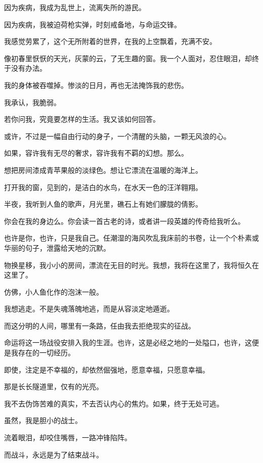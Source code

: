 		\vspace{1em}
		因为疾病，我成为乱世上，流离失所的游民。\par
		因为疾病，我被迫荷枪实弹，时刻戒备地，与命运交锋。\par
		我感觉劳累了，这个无所附着的世界，在我的上空飘着，充满不安。\par
		像初春里恹恹的天光，灰蒙的云，了无生趣的窗。我一个人面对，忍住眼泪，却终于没有办法。\par
		我的身体被吞噬掉。惨淡的日月，再也无法掩饰我的悲伤。\par
		我承认，我脆弱。

		\vspace{1em}
		若你问我，究竟要怎样的生活。我又该如何回答。\par
		或许，不过是一幅自由行动的身子，一个清醒的头脑，一颗无风浪的心。\par
		如果，容许我有无尽的奢求，容许我有不羁的幻想。那么。\par
		想把房间漆成青苹果般的淡绿色。想让它漂流在温暖的海洋上。\par
		打开我的窗，见到的，是洁白的水鸟，在水天一色的汪洋翱翔。\par
		半夜，我听到人鱼的歌声，月光里，礁石上有她们朦胧的倩影。\par
		你会在我的身边么。你会读一首古老的诗，或者讲一段英雄的传奇给我听么。\par
		也许是你，也许，只是我自己。任潮湿的海风吹乱我床前的书卷，让一个个朴素或华丽的句子，泄露给天地的沉默。\par
		物换星移，我小小的房间，漂流在无目的时光。我想，我将在这里了，我将恒久在这里了。\par
		仿佛，小人鱼化作的泡沫一般。

		\vspace{1em}
		我想逃走。不是失魂落魄地逃，而是从容淡定地遁逝。\par
		而这分明的人间，哪里有一条路，任由我去拒绝现实的征战。\par
		命运将这一场战役安排入我的生涯。也许，这是必经之地的一处隘口，也许，这便是我存在的一切经历。\par
		即使，注定是不幸福的，却依然倔强地，愿意幸福，只愿意幸福。\par
		那是长长隧道里，仅有的光亮。\par
		我不去伪饰苦难的真实，不去否认内心的焦灼。如果，终于无处可逃。\par
		虽然，我是胆小的战士。\par
		流着眼泪，却咬住嘴唇，一路冲锋陷阵。

		\vspace{1em}
		而战斗，永远是为了结束战斗。

